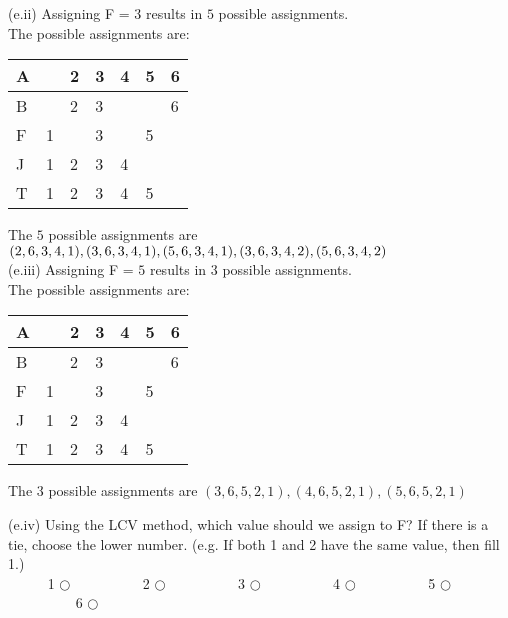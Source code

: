 \documentclass{article}
\begin{document}
\noindent(e.ii) Assigning F = $3$ results in $5$ possible assignments.\\
\noindent The possible assignments are: \\
\renewcommand\arraystretch{1.5}
\begin{table}[tbh!]
\begin{center}
    \begin{tabular}{|p{1cm}| p{1cm}| p{1cm} | p{1cm}| p{1cm}| p{1cm}| p{1cm}|}
\hline
    A &  & 2 & 3 & 4 & 5 & 6  \\ \hline
    B &  & 2 & 3 &   &   & 6  \\ \hline
    F & 1 &  & 3 &   & 5 &   \\ \hline
    J & 1 & 2 & 3 & 4  &  &   \\ \hline
    T & 1 & 2 & 3 & 4  & 5 &   \\ \hline
\end{tabular}
\end{center}
\end{table}

The $5$ possible assignments are $(2, 6, 3, 4, 1), (3, 6, 3, 4, 1), (5, 6, 3, 4, 1), \\ (3, 6, 3, 4, 2), (5, 6, 3, 4, 2)$ \\

\noindent(e.iii) Assigning F = $5$ results in $3$ possible assignments.\\
\noindent The possible assignments are: \\
\renewcommand\arraystretch{1.5}
\begin{table}[tbh!]
\begin{center}
    \begin{tabular}{|p{1cm}| p{1cm}| p{1cm} | p{1cm}| p{1cm}| p{1cm}| p{1cm}|}
\hline
    A &  & 2 & 3 & 4 & 5 & 6  \\ \hline
    B &  & 2 & 3 &   &   & 6  \\ \hline
    F & 1 &  & 3 &   & 5 &   \\ \hline
    J & 1 & 2 & 3 & 4  &  &   \\ \hline
    T & 1 & 2 & 3 & 4  & 5 &   \\ \hline
\end{tabular}
\end{center}
\end{table}

The $3$ possible assignments are $ (3, 6, 5, 2, 1), (4, 6, 5, 2, 1), (5, 6, 5, 2, 1)$

\noindent(e.iv) Using the LCV method, which value should we assign to F? If there is a tie, choose the lower number. (e.g. If both 1 and 2 have the same value, then fill 1.)\\
\indent ~~~~~ 1 $\bigcirc$ ~~~~~~~~~  2 $\bigcirc$ ~~~~~~~~~  3 $\bigcirc$ ~~~~~~~~~  4 $\bigcirc$ ~~~~~~~~~  5 $\bigcirc$~~~~~~~~~  6 $\bigcirc$ \\
\end{document}
